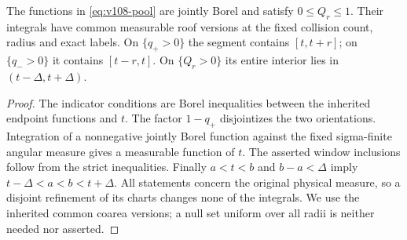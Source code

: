 \begin{lemma}
\label{lem:v108-pool}
The functions in \eqref{eq:v108-pool} are jointly Borel and satisfy
$0\le Q_r\le1$. Their integrals have common measurable roof versions
at the fixed collision count, radius and exact labels. On
$\{q_+>0\}$ the segment contains $[t,t+r]$; on $\{q_->0\}$ it
contains $[t-r,t]$. On $\{Q_r>0\}$ its entire interior lies in
$(t-\Delta,t+\Delta)$.
\end{lemma}
\begin{proof}
The indicator conditions are Borel inequalities between the inherited
endpoint functions and $t$. The factor $1-q_+$ disjointizes the two
orientations. Integration of a nonnegative jointly Borel function
against the fixed sigma-finite angular measure gives a measurable
function of $t$. The asserted window inclusions follow from the
strict inequalities. Finally $a<t<b$ and $b-a<\Delta$ imply
$t-\Delta<a<b<t+\Delta$. All statements concern the original
physical measure, so a disjoint refinement of its charts changes
none of the integrals. We use the inherited common coarea versions;
a null set uniform over all radii is neither needed nor asserted.
\end{proof}

